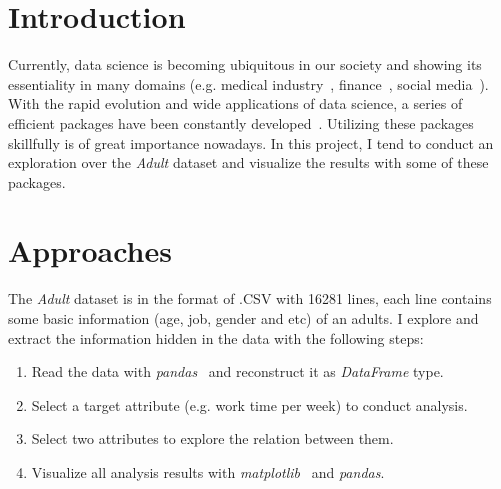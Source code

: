 \documentclass[12pt,a4paper]{article}
\theoremstyle{definition}
\begin{document}
\noindent
\noindent{}
\vspace{-1.5\baselineskip}

\renewcommand{\figurename}{Figure}
\section{Introduction} %

Currently, data science is becoming ubiquitous in our society and showing its essentiality in many domains (e.g. medical industry~\cite{medical1, medical2}, finance~\cite{finance}, social media~\cite{media1, media2}). With the rapid evolution and wide applications of data science, a series of efficient packages have been constantly developed~\cite{numpy, pandas, matplotlib, sklearn}. Utilizing these packages skillfully is of great importance nowadays. In this project, I tend to conduct an exploration over the \textit{Adult} dataset and visualize the results with some of these packages.

\vspace{-1\baselineskip}
\section{Approaches}

The \textit{Adult} dataset is in the format of .CSV with 16281 lines, each line contains some basic information (age, job, gender and etc) of an adults. I explore and extract the information hidden in the data with the following steps:
\begin{enumerate}
\item Read the data with \textit{pandas}~\cite{pandas} and reconstruct it as \textit{DataFrame} type.

\item Select a target attribute (e.g. work time per week) to conduct analysis.

\item Select two attributes to explore the relation between them.

\item Visualize all analysis results with \textit{matplotlib}~\cite{matplotlib} and \textit{pandas}.
\end{enumerate}
\end{document}
